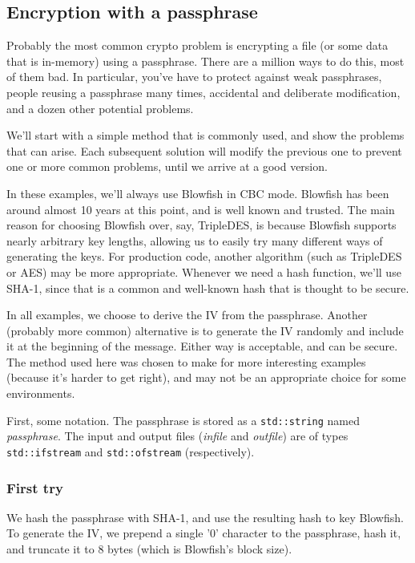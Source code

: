 \documentclass{article}
\newcommand{\type}[1]{\texttt{#1}}
\newcommand{\variable}[1]{\textsl{#1}}
\begin{document}
\subsection{Encryption with a passphrase}

Probably the most common crypto problem is encrypting a file (or some data that
is in-memory) using a passphrase. There are a million ways to do this, most of
them bad. In particular, you've have to protect against weak passphrases,
people reusing a passphrase many times, accidental and deliberate modification,
and a dozen other potential problems.

We'll start with a simple method that is commonly used, and show the problems
that can arise. Each subsequent solution will modify the previous one to
prevent one or more common problems, until we arrive at a good version.

In these examples, we'll always use Blowfish in CBC mode. Blowfish has been
around almost 10 years at this point, and is well known and trusted. The main
reason for choosing Blowfish over, say, TripleDES, is because Blowfish supports
nearly arbitrary key lengths, allowing us to easily try many different ways of
generating the keys. For production code, another algorithm (such as TripleDES
or AES) may be more appropriate. Whenever we need a hash function, we'll use
SHA-1, since that is a common and well-known hash that is thought to be secure.

In all examples, we choose to derive the IV from the passphrase. Another
(probably more common) alternative is to generate the IV randomly and include
it at the beginning of the message. Either way is acceptable, and can be
secure. The method used here was chosen to make for more interesting examples
(because it's harder to get right), and may not be an appropriate choice for
some environments.

First, some notation. The passphrase is stored as a \type{std::string} named
\variable{passphrase}. The input and output files (\variable{infile} and
\variable{outfile}) are of types \type{std::ifstream} and \type{std::ofstream}
(respectively).

\subsubsection{First try}

We hash the passphrase with SHA-1, and use the resulting hash to key Blowfish.
To generate the IV, we prepend a single '0' character to the passphrase, hash
it, and truncate it to 8 bytes (which is Blowfish's block size).
\end{document}
